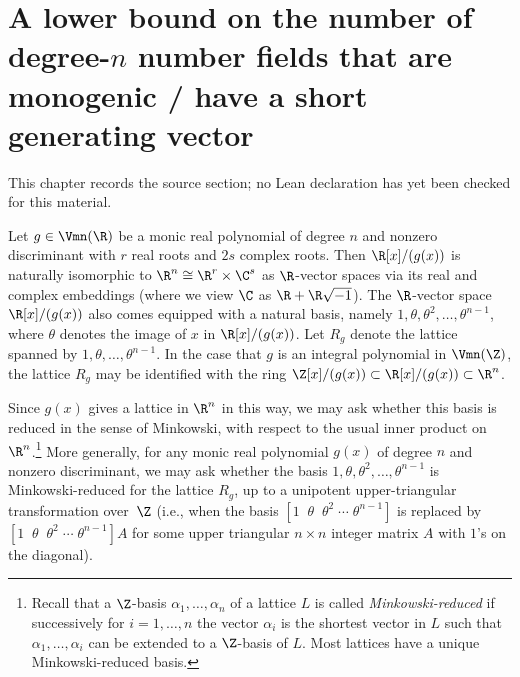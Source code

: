 \chapter{A lower bound on the number of degree-$n$ number fields that are monogenic / have a short generating vector}
\label{squarefree-values-polynomial-discriminants-chapter-05}

\begin{remark}
\label{squarefree-values-polynomial-discriminants-chapter-05-source}
This chapter records the source section; no Lean declaration has yet been checked for this material.
\notready
\end{remark}

\label{latticearg}

Let $g\in \Vmn(\R)$ be a monic real polynomial of degree $n$ and
nonzero discriminant with $r$ real roots and $2s$ complex roots.  Then
$\R[x]/(g(x))$ is naturally isomorphic to $\R^n\cong \R^r\times \C^s$
as $\R$-vector spaces via its real and complex embeddings (where we
view $\C$ as $\R+\R\sqrt{-1}$).  The $\R$-vector space $\R[x]/(g(x))$
also comes equipped with a natural basis, namely
$1,\theta,\theta^2,\ldots,\theta^{n-1}$, where $\theta$ denotes the
image of $x$ in $\R[x]/(g(x))$. Let $R_g$ denote the lattice spanned
by $1,\theta,\ldots,\theta^{n-1}.$ In the case that $g$ is an integral
polynomial in $\Vmn(\Z)$, the lattice $R_g$ may be identified with the
ring $\Z[x]/(g(x))\subset\R[x]/(g(x))\subset \R^n$.

Since $g(x)$ gives a lattice in $\R^n$ in this way, we may ask whether
this basis is reduced in the sense of Minkowski, with respect to the
usual inner product on $\R^n$.\footnote{Recall that a $\Z$-basis
  $\alpha_1,\ldots,\alpha_n$ of a lattice $L$ is called {\it
    Minkowski-reduced} if successively for $i=1,\ldots, n$ the vector
  $\alpha_i$ is the shortest vector in $L$ such that
  $\alpha_1,\ldots,\alpha_i$ can be extended to a $\Z$-basis of
  $L$. Most lattices have a unique Minkowski-reduced basis.}  More
generally, for any monic real polynomial $g(x)$ of degree $n$ and
nonzero discriminant, we may ask whether the basis
$1,\theta,\theta^2,\ldots,\theta^{n-1}$ is Minkowski-reduced for the
lattice $R_g$, up to a unipotent upper-triangular transformation
over~$\Z$ (i.e., when the basis $[1\;\;\theta\;\;\theta^2\;\cdots\;
  \theta^{n-1}]$ is replaced by $[1\;\;\theta\;\;\theta^2\;\cdots\;
  \theta^{n-1}]A$ for some upper triangular $n\times n$ integer matrix
$A$ with $1$'s on the diagonal).

